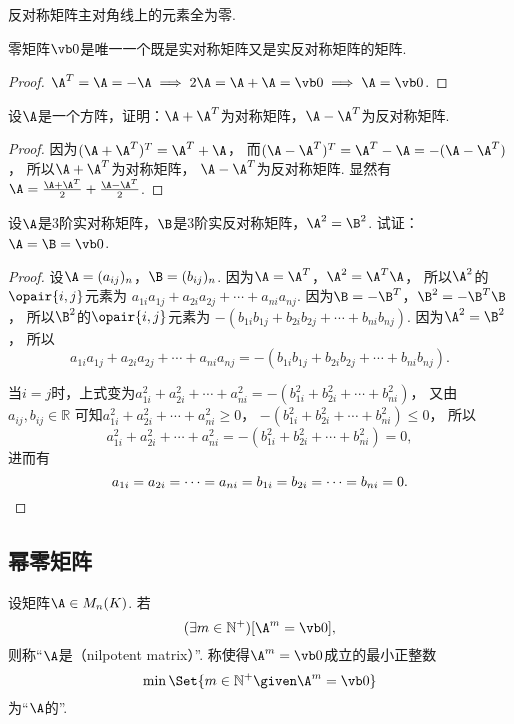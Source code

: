 \begin{property}
反对称矩阵主对角线上的元素全为零.
\end{property}

\begin{example}
零矩阵\(\vb0\)是唯一一个既是实对称矩阵又是实反对称矩阵的矩阵.
\begin{proof}
\(\A^T = \A = -\A \implies 2\A = \A+\A = \vb0 \implies \A = \vb0\).
\end{proof}
\end{example}

\begin{example}
设\(\A\)是一个方阵，证明：\(\A+\A^T\)为对称矩阵，\(\A-\A^T\)为反对称矩阵.
\begin{proof}
因为\((\A+\A^T)^T = \A^T+\A\)，
而\((\A-\A^T)^T = \A^T - \A = -(\A-\A^T)\)，
所以\(\A+\A^T\)为对称矩阵，
\(\A-\A^T\)为反对称矩阵.
显然有\(\A = \frac{\A + \A^T}{2} + \frac{\A - \A^T}{2}\).
\end{proof}
\end{example}

\begin{example}
设\(\A\)是3阶实对称矩阵，\(\B\)是3阶实反对称矩阵，\(\A^2 = \B^2\).
试证：\(\A = \B = \vb0\).
\begin{proof}
设\(\A = (a_{ij})_n\)，\(\B = (b_{ij})_n\).
因为\(\A = \A^T\)，\(\A^2 = \A^T \A\)，
所以\(\A^2\)的\(\opair{i,j}\)元素为
\(a_{1i} a_{1j} + a_{2i} a_{2j} + \dotsb + a_{ni} a_{nj}\).
因为\(\B = -\B^T\)，\(\B^2 = -\B^T \B\)，
所以\(\B^2\)的\(\opair{i,j}\)元素为
\(-(b_{1i} b_{1j} + b_{2i} b_{2j} + \dotsb + b_{ni} b_{nj})\).
因为\(\A^2 = \B^2\)，
所以\[
	a_{1i} a_{1j} + a_{2i} a_{2j} + \dotsb + a_{ni} a_{nj}
	= -(b_{1i} b_{1j} + b_{2i} b_{2j} + \dotsb + b_{ni} b_{nj}).
\]

当\(i=j\)时，上式变为\(a_{1i}^2 + a_{2i}^2 + \dotsb + a_{ni}^2
= -(b_{1i}^2 + b_{2i}^2 + \dotsb + b_{ni}^2)\)，
又由\(a_{ij},b_{ij} \in \mathbb{R}\)
可知\(a_{1i}^2 + a_{2i}^2 + \dotsb + a_{ni}^2 \geq 0\)，
\(-(b_{1i}^2 + b_{2i}^2 + \dotsb + b_{ni}^2) \leq 0\)，
所以\[
	a_{1i}^2 + a_{2i}^2 + \dotsb + a_{ni}^2
	= -(b_{1i}^2 + b_{2i}^2 + \dotsb + b_{ni}^2) = 0,
\]
进而有\[
	a_{1i} = a_{2i} = \dotsb = a_{ni} = b_{1i} = b_{2i} = \dotsb = b_{ni} = 0.
	\qedhere
\]
\end{proof}
\end{example}

\subsection{幂零矩阵}
\begin{definition}
设矩阵\(\A \in M_n(K)\).
若\[
	(\exists m\in\mathbb{N}^+)
	[\A^m = \vb0],
\]
则称“\(\A\)是（nilpotent matrix）”.
称使得\(\A^m = \vb0\)成立的最小正整数\[
    \min\Set{ m\in\mathbb{N}^+ \given \A^m = \vb0 }
\]为“\(\A\)的”.
\end{definition}

